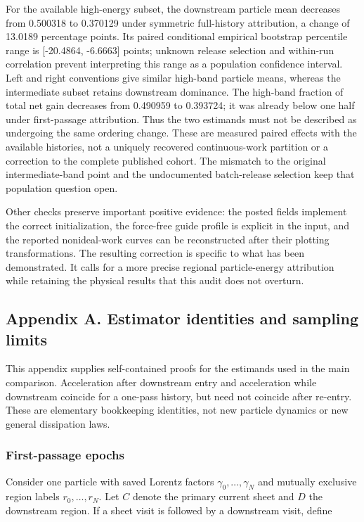 For the available high-energy subset, the downstream particle mean
decreases from 0.500318 to 0.370129 under symmetric full-history
attribution, a change of 13.0189 percentage points. Its paired
conditional empirical bootstrap percentile range is {[}-20.4864,
-6.6663{]} points; unknown release selection and within-run correlation
prevent interpreting this range as a population confidence interval.
Left and right conventions give similar high-band particle means,
whereas the intermediate subset retains downstream dominance. The
high-band fraction of total net gain decreases from 0.490959 to
0.393724; it was already below one half under first-passage attribution.
Thus the two estimands must not be described as undergoing the same
ordering change. These are measured paired effects with the available
histories, not a uniquely recovered continuous-work partition or a
correction to the complete published cohort. The mismatch to the
original intermediate-band point and the undocumented batch-release
selection keep that population question open.

Other checks preserve important positive evidence: the posted fields
implement the correct initialization, the force-free guide profile is
explicit in the input, and the reported nonideal-work curves can be
reconstructed after their plotting transformations. The resulting
correction is specific to what has been demonstrated. It calls for a
more precise regional particle-energy attribution while retaining the
physical results that this audit does not overturn.

\subsection{Appendix A. Estimator identities and sampling
limits}\label{appendix-a.-estimator-identities-and-sampling-limits}

This appendix supplies self-contained proofs for the estimands used in
the main comparison. Acceleration after downstream entry and
acceleration while downstream coincide for a one-pass history, but need
not coincide after re-entry. These are elementary bookkeeping
identities, not new particle dynamics or new general dissipation laws.

\subsubsection{First-passage epochs}\label{first-passage-epochs}

Consider one particle with saved Lorentz factors
\(\gamma_0,\ldots,\gamma_N\) and mutually exclusive region labels
\(r_0,\ldots,r_N\). Let \(C\) denote the primary current sheet and \(D\)
the downstream region. If a sheet visit is followed by a downstream
visit, define

